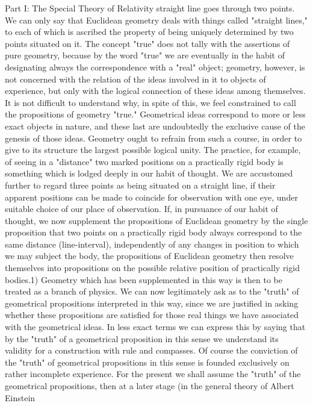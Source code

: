 \documentclass{article}
\begin{document}
Part I: The Special Theory of Relativity
straight line goes through two points. We can only say that Euclidean geometry deals with
things called "straight lines," to each of which is ascribed the property of being uniquely
determined by two points situated on it. The concept "true" does not tally with the
assertions of pure geometry, because by the word "true" we are eventually in the habit of
designating always the correspondence with a "real" object; geometry, however, is not
concerned with the relation of the ideas involved in it to objects of experience, but only with
the logical connection of these ideas among themselves.
It is not difficult to understand why, in spite of this, we feel constrained to call the
propositions of geometry "true." Geometrical ideas correspond to more or less exact objects
in nature, and these last are undoubtedly the exclusive cause of the genesis of those ideas.
Geometry ought to refrain from such a course, in order to give to its structure the largest
possible logical unity. The practice, for example, of seeing in a "distance" two marked
positions on a practically rigid body is something which is lodged deeply in our habit of
thought. We are accustomed further to regard three points as being situated on a straight
line, if their apparent positions can be made to coincide for observation with one eye, under
suitable choice of our place of observation.
If, in pursuance of our habit of thought, we now supplement the propositions of
Euclidean geometry by the single proposition that two points on a practically rigid body
always correspond to the same distance (line-interval), independently of any changes in
position to which we may subject the body, the propositions of Euclidean geometry then
resolve themselves into propositions on the possible relative position of practically rigid
bodies.1) Geometry which has been supplemented in this way is then to be treated as a
branch of physics. We can now legitimately ask as to the "truth" of geometrical propositions
interpreted in this way, since we are justified in asking whether these propositions are
satisfied for those real things we have associated with the geometrical ideas. In less exact
terms we can express this by saying that by the "truth" of a geometrical proposition in this
sense we understand its validity for a construction with rule and compasses.
Of course the conviction of the "truth" of geometrical propositions in this sense is
founded exclusively on rather incomplete experience. For the present we shall assume the
"truth" of the geometrical propositions, then at a later stage (in the general theory of
Albert Einstein
\end{document}
